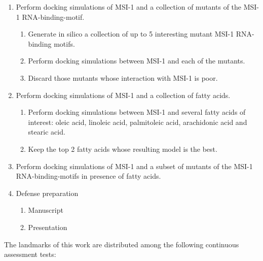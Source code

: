 \begin{enumerate}
    \item Perform docking simulations of MSI-1 and a collection of mutants of the MSI-1 RNA-binding-motif.
        \begin{enumerate}
            \item Generate in silico a collection of up to 5 interesting mutant MSI-1 RNA-binding motifs.
            \item Perform docking simulations between MSI-1 and each of the mutants.
            \item Discard those mutants whose interaction with MSI-1 is poor.
        \end{enumerate}
    \item Perform docking simulations of MSI-1 and a collection of fatty acids.
        \begin{enumerate}
            \item Perform docking simulations between MSI-1 and several fatty acids of interest: oleic acid, linoleic acid, palmitoleic acid, arachidonic acid and stearic acid.
            \item Keep the top 2 fatty acids whose resulting model is the best.
        \end{enumerate}
    \item Perform docking simulations of MSI-1 and a subset of mutants of the MSI-1 RNA-binding-motifs in presence of fatty acids.
    \pagebreak
    \item Defense preparation
        \begin{enumerate}
            \item Manuscript
            \item Presentation
        \end{enumerate}
\end{enumerate}

The landmarks of this work are distributed among the following continuous assessment tests:

